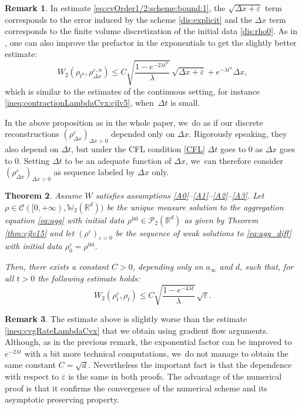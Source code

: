 \documentclass[11pt]{article}
\numberwithin{equation}{section}
\newcommand{\ini}{\mathrm{ini}}
\def\RR{\mathbb{R}}
\def\WW{\mathbb{W}}
\def\eps{\varepsilon}
\def\dt{\Delta t}
\def\dx{\Delta x}
\def\calC{{\mathcal C}}
\def\calP{{\mathcal P}}
\theoremstyle{plain}
\newtheorem{theorem}{Theorem}[section]
\theoremstyle{definition}
\newtheorem{remark}[theorem]{Remark}
\begin{document}
\begin{remark}\mbox{}
In estimate \eqref{eq:cvOrder1/2:scheme:bound:1}, the $\sqrt{\dx + \eps}$ term corresponds to the error induced by the scheme \eqref{dis:explicit} and the $\dx$ term corresponds to the finite volume discretization of the initial data \eqref{dis:rho0}. As in \cite{dlv20}, one can also improve the prefactor in the exponentials to get the slightly better estimate:
\[
W_2(\rho_{t^n},\rho_{\dx}^{\eps,n} ) \leq C \sqrt{\frac{1 - e^{-2\lambda t^n}}{\lambda}}\, \sqrt{\dx + \eps} + e^{-\lambda t^n} \dx,
\]
which is similar to the estimates of the continuous setting, for instance \eqref{ineq:contractionLambdaCvx:cjlv5}, when~$\dt$ is small.
\end{remark}
In the above proposition as in the whole paper, we~do as if our discrete reconstructions $(\rho_{\dx}^\eps)_{\dx >0}$ depended only on $\dx$. Rigorously speaking, they also depend on $\dt$, but under the CFL condition \eqref{CFL} $\dt$ goes to 0 as $\dx$ goes to 0. Setting $\dt$ to be an adequate function of $\dx$, we~can therefore consider $(\rho_{\dx}^\eps)_{\dx >0}$ as sequence labeled by $\dx$ only.
\begin{theorem}\label{thm:cvOrder1/2:scheme}
Assume $W$ satisfies assumptions \eqref{A0}--\eqref{A1}--\eqref{A2}--\eqref{A3}. Let $\rho \in \calC([0,+\infty), \WW_2(\RR^d))$ be the unique measure solution to the aggregation equation \eqref{eq:agg} with initial data $\rho^{\ini} \in \calP_2(\RR^d)$ as given by Theorem \ref{thm:cjlv15} and let $(\rho^\eps)_{\eps > 0}$ be the sequence of weak solutions to \eqref{eq:agg_diff} with initial data $\rho_0^\eps = \rho^{\ini}$.

Then, there exists a constant $C>0$, depending only on $a_\infty$ and $d$, such that, for all $t>0$ the following estimate holds:
\begin{equation}\label{eq:cvOrder1/2:scheme:bound:2}
W_2(\rho_t^\eps,\rho_t) \leq C \sqrt{\frac{1 - e^{-4\lambda t}}{\lambda}}\, \sqrt{\eps}.
\end{equation}
\end{theorem}
\begin{remark}
The estimate above is slightly worse than the estimate \eqref{ineq:cvgRateLambdaCvx} that we obtain using gradient flow arguments. Although, as in the previous remark, the exponential factor can be improved to $e^{-2\lambda t}$ with a bit more technical computations, we~do not manage to obtain the same constant $C=\sqrt{d}$. Nevertheless the important fact is that the dependence with respect to $\eps$ is the same in both proofs. The advantage of the numerical proof is that it confirms the convergence of the numerical scheme and its asymptotic preserving property.
\end{remark}
\end{document}
